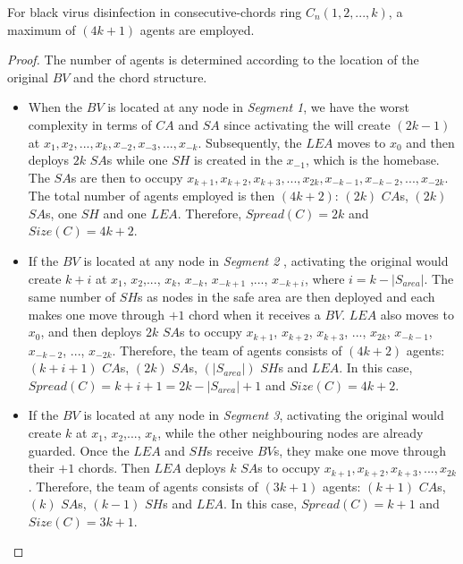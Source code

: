  
\begin{theorem}\label{theo:agents_cc}
For black virus disinfection in consecutive-chords ring $C_n(1,2,...,k)$, a maximum of $(4k+1)$ agents are employed.

\end{theorem}
\begin{proof}
The number of agents is determined according to the location of the original $BV$ and the chord structure.
\begin{itemize} 
\item
When the $BV$ is located at any node in  {\em Segment 1}, 
we have  the worst complexity in terms of $CA$ and $SA$ since activating the \bv will create $(2k-1)$ \bvs at $x_{1},x_{2},...,x_{k},x_{-2},x_{-3},...,x_{-k}$. Subsequently, the $LEA$ moves to $x_{0}$ and then deploys $2k$ $SA$s while one $SH$ is created in the $x_{-1}$, which is the homebase.
The $SA$s are then to occupy $x_{k+1},x_{k+2},x_{k+3},...,x_{2k},x_{-k-1},x_{-k-2},...,x_{-2k}$. The total number of agents employed is then $(4k+2)$:  $(2k)$ $CA$s, $(2k)$  $SA$s, one $SH$ and one $LEA$. Therefore, $Spread(C)=2k$ and $Size(C)=4k+2$.   
 
\item If the $BV$ is located at any node in {\em  Segment 2 },
activating the original \bv would create $k+i$  \bvs at $x_{1}$, $x_{2}$,..., $x_{k}$, $x_{-k}$, $x_{-k+1}$ ,..., $x_{-k+i}$, where $i=k-|S_{area}|$. The same number of $SH$s as nodes in the safe area are then deployed and each makes one move through $+1$ chord when it receives a $BV$. $LEA$ also moves to $x_{0}$, and then  deploys $2k$  $SA$s to occupy $x_{k+1}$, $x_{k+2}$, $x_{k+3}$, ..., $x_{2k}$, $x_{-k-1}$, $x_{-k-2}$, ..., $x_{-2k}$.
Therefore, the team of agents consists  of $(4k+2)$ agents: $(k+i+1)$ $CA$s, $(2k)$  $SA$s, $(|S_{area}|)$ $SH$s and $LEA$. In this case,  $Spread(C)=k+i+1=2k-|S_{area}|+1$ and $Size(C)=4k+2$.


\item If the $BV$ is located at any node in {\em Segment 3},
activating the original \bv would create $k$  \bvs at $x_{1}$, $x_{2}$,..., $x_{k}$,  while the other neighbouring nodes are already guarded. Once the $LEA$ and $SH$s receive $BV$s, they make one move through their $+1$ chords. Then $LEA$  deploys $k$  $SA$s to occupy $x_{k+1},x_{k+2},x_{k+3},...,x_{2k}$.
Therefore, the team of agents consists  of $(3k+1)$ agents: $(k+1)$ $CA$s, $(k)$  $SA$s, $(k-1)$ $SH$s and $LEA$. In this case,  $Spread(C)=k+1$ and $Size(C)=3k+1$.
 

\end{itemize}
\end{proof}
